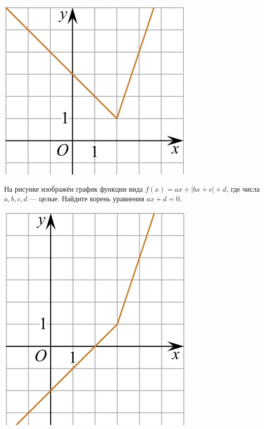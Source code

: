 \begin{class}[number=5]
\begin{listofex}
\begin{minipage}[c]{0.17\textwidth}
			\includegraphics[align=t, width=\textwidth]{pics/G101M4C5-7.jpg}
		\end{minipage}
		\item
		\begin{minipage}[t]{0.43\textwidth}
			На рисунке изображён график функции вида \(f(x)=ax+|bx+c|+d\), где числа \(a, b, c, d\) --- целые. Найдите корень уравнения \(ax+d=0\).
		\end{minipage}
		\begin{minipage}[c]{0.17\textwidth}
			\includegraphics[align=t, width=\textwidth]{pics/G101M4C5-8.jpg}

\end{minipage}
\end{listofex}
\end{class}
